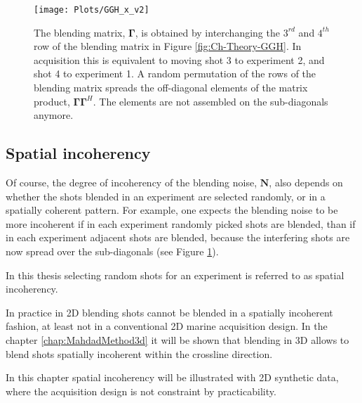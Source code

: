\begin{figure}
	\centering
	\texttt{[image: Plots/GGH\_x\_v2]}
	\caption{The blending matrix, $\mathbf{\Gamma}$, is obtained by interchanging the $3^{rd}$ and $4^{th}$ row of the blending matrix in Figure \ref{fig:Ch-Theory-GGH}. In acquisition this is equivalent to moving shot 3 to experiment 2, and shot 4 to experiment 1. A random permutation of the rows of the blending matrix spreads the off-diagonal elements of the matrix product, $\mathbf{\Gamma\Gamma}^H$. The elements are not assembled on the sub-diagonals anymore.}
	\label{fig:Ch-Theory-GGHx}
\end{figure}

\subsection*{Spatial incoherency}

Of course, the degree of incoherency of the blending noise, $\mathbf{N}$, also depends on whether the shots blended in an experiment are selected randomly, or in a spatially coherent pattern. For example, one expects the blending noise to be more incoherent if in each experiment randomly picked shots are blended, than if in each experiment adjacent shots are blended, because the interfering shots are now spread over the sub-diagonals (see Figure \ref{fig:Ch-Theory-GGHx}).

In this thesis selecting random shots for an experiment is referred to as spatial incoherency.

In practice in 2D blending shots cannot be blended in a spatially incoherent fashion, at least not in a conventional 2D marine acquisition design. In the chapter \ref{chap:MahdadMethod3d} it will be shown that blending in 3D allows to blend shots spatially incoherent within the crossline direction. 

In this chapter spatial incoherency will be illustrated with 2D synthetic data, where the acquisition design is not constraint by practicability.



